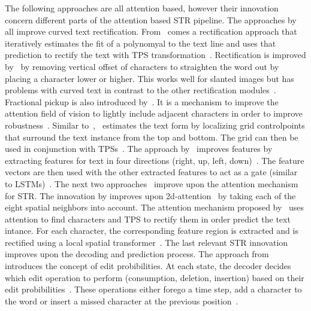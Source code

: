 The following approaches are all attention based, however their innovation concern different parts
of the attention based \ac{STR} pipeline.
The approaches by~\cite{zhan_esir_2019,luo_multi-object_2019,shi_aster_2019} all improve curved
text rectification.
From~\cite{zhan_esir_2019} comes a rectification approach that iteratively estimates the fit of a
polynomyal to the text line and uses that prediction to rectify the text with \ac{TPS}
transformation~\citep{bookstein_principal_1989,zhan_esir_2019}.
Rectification is improved by~\cite{luo_multi-object_2019} by removing vertical offset of characters
to straighten the word out by placing a character lower or higher.
This works well for slanted images but has problems with curved text in contrast to the other
rectification modules~\citep{zhan_esir_2019,liu_star-net_2016,long_scene_2021}.
Fractional pickup is also introduced by~\cite{luo_multi-object_2019}.
It is a mechanism to improve the attention field of vision to lightly include adjacent characters
in order to improve robustness~\citep{luo_multi-object_2019}.
Similar to~\cite{zhan_esir_2019},~\cite{shi_aster_2019} estimates the text form by localizing
grid controlpoints that surround the text instance from the top and bottom.
The grid can then be used in conjunction with \acp{TPS}~\citep{shi_aster_2019}.
The approach by~\cite{cheng_aon_2018} improves features by extracting features for text in
four directions (right, up, left, down)~\citep{cheng_aon_2018}.
The feature vectors are then used with the other extracted features to act as a gate (similar to
\acp{LSTM})~\citep{cheng_aon_2018}.
The next two approaches~\citep{li_show_2019,liu_char-net_2018} improve upon the attention mechanism
for \ac{STR}.
The innovation by improves upon 2d-attention~\citep{xu_show_2016} by taking each of the eight
spatial neighbors into account.
The attention mechanism proposed by~\cite{liu_char-net_2018} uses attention to find characters and
\ac{TPS} to rectify them in order predict the text intance.
For each character, the corresponding feature region is extracted and is
rectified using a local spatial transformer~\citep{liu_char-net_2018}.
The last relevant \ac{STR} innovation improves upon the decoding and prediction process.
The approach from~\cite{bai_edit_2018} introduces the concept of edit probibilities.
At each state, the decoder decides which edit operation to perform (consumption, deletion, insertion)
based on their edit probibilities~\citep{bai_edit_2018}.
These operations either forego a time step, add a character to the word or insert a missed character
at the previous position~\cite{bai_edit_2018}.

